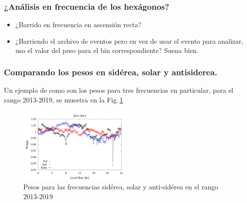 \subsubsection{¿Análisis en frecuencia de los hexágonos?} \label{analisis_peso}
\begin{itemize}
	\item ¿Barrido en frecuencia en ascensión recta?
	\item ¿Barriendo el archivo de eventos pero en vez de usar el evento para analizar, uso el valor del peso para el bin correspondiente? Suena bien.
\end{itemize}



\subsubsection{Comparando los pesos en sidérea, solar y antisiderea.}

Un ejemplo de como son los pesos para tres frecuencias en particular, para el rango 2013-2019, se muestra en la Fig.\,\ref{fig:pesos}


\begin{figure}[H]
	\centering
	\includegraphics[width=0.5\textwidth]{weigth2013-2019.png}
	\caption{Pesos para las frecuencias sidérea, solar y anti-sidérea en el rango 2013-2019}
	\label{fig:pesos}
\end{figure}


